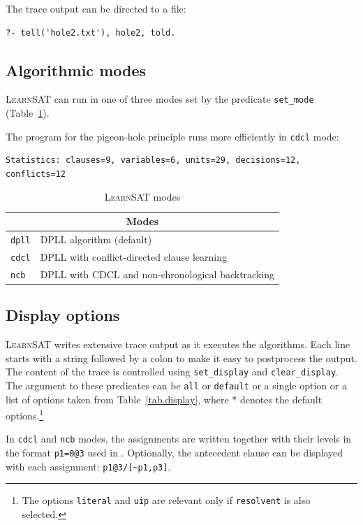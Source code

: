 \documentclass[11pt]{report}
\newcommand*{\p}[1]{\textup{\texttt{#1}}}
\newcommand*{\ls}{\textsc{LearnSAT}}
\begin{document}
The trace output can be directed to a file:

\begin{verbatim}
?- tell('hole2.txt'), hole2, told.
\end{verbatim}

\newpage

\subsection{Algorithmic modes}

\ls{} can run in one of three modes set by the predicate \p{set\_mode}
(Table~\ref{tab.modes}).

The program for the pigeon-hole principle runs more efficiently in
\p{cdcl} mode:
\begin{verbatim}
Statistics: clauses=9, variables=6, units=29, decisions=12, conflicts=12
\end{verbatim}

\begin{table}[*hb]
\begin{center}
\begin{tabular}{|l|l|}
\hline
\multicolumn{2}{|c|}{\textbf{\large Modes}}\\
\hline
\p{dpll} & DPLL algorithm (default)\\
\p{cdcl} & DPLL with conflict-directed clause learning\\
\p{ncb} &  DPLL with CDCL and non-chronological backtracking\\
\hline
\end{tabular}
\caption{\ls{} modes}\label{tab.modes}
\end{center}
\end{table}

\subsection{Display options}

\ls{} writes extensive trace output as it executes the algorithms. Each
line starts with a string followed by a colon to make it easy to
postprocess the output. The content of the trace is controlled using
\p{set\_display} and \p{clear\_display}. The argument to these
predicates can be \p{all} or \p{default} or a single option or a list of
options taken from Table~\ref{tab.display}, where * denotes the default
options.\footnote{The options \p{literal} and \p{uip} are relevant only
if \p{resolvent} is also selected.}

In \p{cdcl} and \p{ncb} modes, the assignments are written together with
their levels in the format \p{p1=0@3} used in \cite{mlm}. Optionally,
the antecedent clause can be displayed with each assignment:
\verb+p1@3/[~p1,p3]+.
\end{document}
